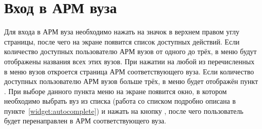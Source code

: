 \section{Вход в АРМ вуза} \label{sec:cabinet}
Для входа в АРМ вуза необходимо нажать на значок  в верхнем правом углу страницы,
после чего на экране появится список доступных действий. Если количество доступных пользователю АРМ вузов от одного до трёх, в меню будут отображены названия всех этих вузов. При нажатии на любой из перечисленных в меню вузов откроется страница АРМ соответствующего вуза. Если количество доступных пользователю АРМ вузов больше трёх, в меню будет отображён пункт . При выборе данного пункта меню на экране появится окно, в котором необходимо выбрать вуз из списка (работа со списком подробно описана в пункте~\ref{widget:autocomplete}) и нажать на кнопку , после чего пользователь будет перенаправлен в АРМ соответствующего вуза.